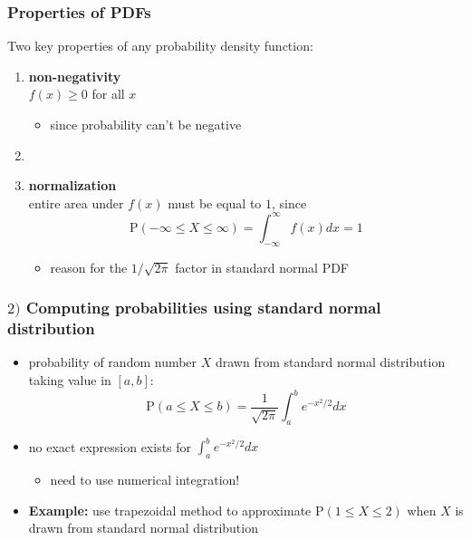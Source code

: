\documentclass[english,14pt]{beamer}
\begin{document}
\begin{frame}[fragile]

\frametitle{Properties of PDFs}

Two key properties of any probability density function:
\vspace*{5mm}
\begin{enumerate}
	\item \textbf{non-negativity} \\ \vspace*{2mm}
 $f(x) \geq 0$ for all $x$
 	\begin{itemize}
		\item since probability can't be negative
	\end{itemize}
	\item[]
	\item \textbf{normalization} \\ \vspace*{2mm}
	 entire area under $f(x)$ must be equal to $1$, since
	\[
\mathrm{P}(-\infty \leq X \leq \infty) = \int_{-\infty}^\infty f(x) dx = 1 
\] 
	\begin{itemize}
		\item reason for the $1/\sqrt{2\pi}$ factor in standard normal PDF
	\end{itemize}	
\end{enumerate}

\end{frame}


\begin{frame}[fragile]

\frametitle{$2)$ Computing probabilities using standard \hspace*{8mm} normal distribution}

\begin{itemize}
	\item probability of random number $X$ drawn from standard normal distribution taking value in $[a,b]$:
	\[
	\mathrm{P}(a \leq X \leq b) = \frac{1}{\sqrt{2\pi}} \int_a^b  e^{-x^2/2} dx
	\]
	\item no exact expression exists for $\int_a^b e^{-x^2/2} dx$
	\begin{itemize}
		\item need to use numerical integration!
	\end{itemize}
	\item \textbf{Example:} use trapezoidal method to approximate $\mathrm{P}(1 \leq X \leq 2)$ when $X$ is drawn from standard normal distribution
\end{itemize}

\end{frame}
\end{document}
